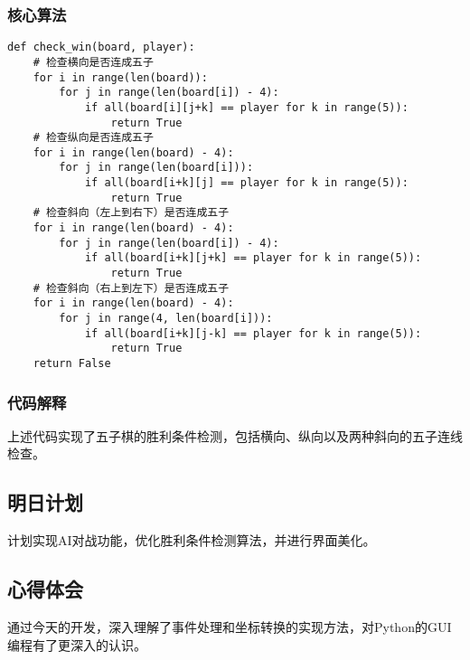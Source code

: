 \subsubsection{核心算法}
\begin{lstlisting}[caption={五子棋算法核心代码（2024年4月27日）}, label={code:core_0427}]
def check_win(board, player):
    # 检查横向是否连成五子
    for i in range(len(board)):
        for j in range(len(board[i]) - 4):
            if all(board[i][j+k] == player for k in range(5)):
                return True
    # 检查纵向是否连成五子
    for i in range(len(board) - 4):
        for j in range(len(board[i])):
            if all(board[i+k][j] == player for k in range(5)):
                return True
    # 检查斜向（左上到右下）是否连成五子
    for i in range(len(board) - 4):
        for j in range(len(board[i]) - 4):
            if all(board[i+k][j+k] == player for k in range(5)):
                return True
    # 检查斜向（右上到左下）是否连成五子
    for i in range(len(board) - 4):
        for j in range(4, len(board[i])):
            if all(board[i+k][j-k] == player for k in range(5)):
                return True
    return False
\end{lstlisting}

\subsubsection{代码解释}
上述代码实现了五子棋的胜利条件检测，包括横向、纵向以及两种斜向的五子连线检查。

\subsection{明日计划} %
计划实现AI对战功能，优化胜利条件检测算法，并进行界面美化。

\subsection{心得体会} %
通过今天的开发，深入理解了事件处理和坐标转换的实现方法，对Python的GUI编程有了更深入的认识。
